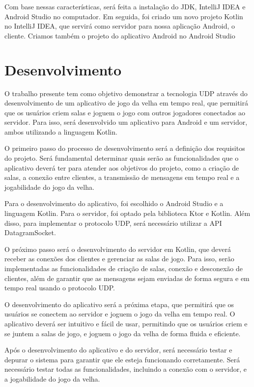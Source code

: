 \documentclass[12pt]{article}
\begin{document}
Com base nessas características, será feita a instalação do JDK, IntelliJ IDEA e Android Studio no computador. Em seguida, foi criado um novo projeto Kotlin no IntelliJ IDEA, que servirá como servidor para nossa aplicação Android, o cliente. Criamos também o projeto do aplicativo Android no Android Studio

\section{Desenvolvimento}
 O trabalho presente tem como objetivo demonstrar a tecnologia UDP através do desenvolvimento de um aplicativo de jogo da velha em tempo real, que permitirá que os usuários criem salas e joguem o jogo com outros jogadores conectados ao servidor. Para isso, será desenvolvido um aplicativo para Android e um servidor, ambos utilizando a linguagem Kotlin.

O primeiro passo do processo de desenvolvimento será a definição dos requisitos do projeto. Será fundamental determinar quais serão as funcionalidades que o aplicativo deverá ter para atender aos objetivos do projeto, como a criação de salas, a conexão entre clientes, a transmissão de mensagens em tempo real e a jogabilidade do jogo da velha.

Para o desenvolvimento do aplicativo, foi escolhido o Android Studio e a linguagem Kotlin. Para o servidor, foi optado pela biblioteca Ktor e Kotlin. Além disso, para implementar o protocolo UDP, será necessário utilizar a API DatagramSocket.

O próximo passo será o desenvolvimento do servidor em Kotlin, que deverá receber as conexões dos clientes e gerenciar as salas de jogo. Para isso, serão implementadas as funcionalidades de criação de salas, conexão e desconexão de clientes, além de garantir que as mensagens sejam enviadas de forma segura e em tempo real usando o protocolo UDP.

O desenvolvimento do aplicativo será a próxima etapa, que permitirá que os usuários se conectem ao servidor e joguem o jogo da velha em tempo real. O aplicativo deverá ser intuitivo e fácil de usar, permitindo que os usuários criem e se juntem a salas de jogo, e joguem o jogo da velha de forma fluida e eficiente.

Após o desenvolvimento do aplicativo e do servidor, será necessário testar e depurar o sistema para garantir que ele esteja funcionando corretamente. Será necessário testar todas as funcionalidades, incluindo a conexão com o servidor, e a jogabilidade do jogo da velha.
\end{document}
